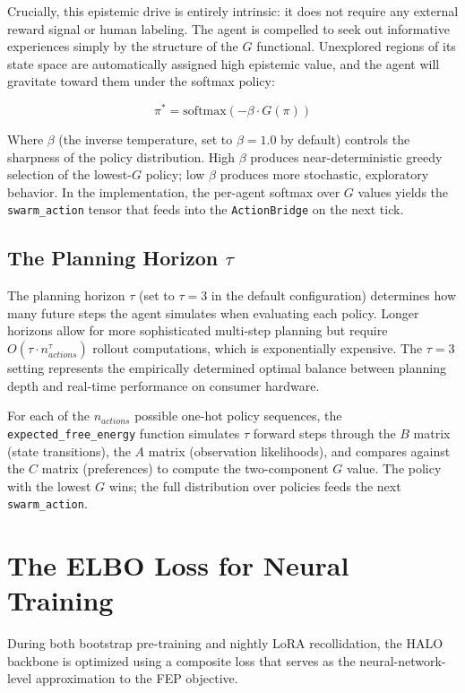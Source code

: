 Crucially, this epistemic drive is entirely intrinsic: it does not require any external reward signal or human labeling. The agent is compelled to seek out informative experiences simply by the structure of the $G$ functional. Unexplored regions of its state space are automatically assigned high epistemic value, and the agent will gravitate toward them under the softmax policy:

\begin{equation}
\pi^* = \text{softmax}(-\beta \cdot G(\pi))
\label{eq:policy}
\end{equation}

Where $\beta$ (the inverse temperature, set to $\beta = 1.0$ by default) controls the sharpness of the policy distribution. High $\beta$ produces near-deterministic greedy selection of the lowest-$G$ policy; low $\beta$ produces more stochastic, exploratory behavior. In the implementation, the per-agent softmax over $G$ values yields the \texttt{swarm\_action} tensor that feeds into the \texttt{ActionBridge} on the next tick.

\subsection{The Planning Horizon $\tau$}

The planning horizon $\tau$ (set to $\tau = 3$ in the default configuration) determines how many future steps the agent simulates when evaluating each policy. Longer horizons allow for more sophisticated multi-step planning but require $O(\tau \cdot n_{actions}^{\tau})$ rollout computations, which is exponentially expensive. The $\tau = 3$ setting represents the empirically determined optimal balance between planning depth and real-time performance on consumer hardware.

For each of the $n_{actions}$ possible one-hot policy sequences, the \texttt{expected\_free\_energy} function simulates $\tau$ forward steps through the $B$ matrix (state transitions), the $A$ matrix (observation likelihoods), and compares against the $C$ matrix (preferences) to compute the two-component $G$ value. The policy with the lowest $G$ wins; the full distribution over policies feeds the next \texttt{swarm\_action}.

\section{The ELBO Loss for Neural Training}

During both bootstrap pre-training and nightly LoRA recollidation, the HALO backbone is optimized using a composite loss that serves as the neural-network-level approximation to the FEP objective.

